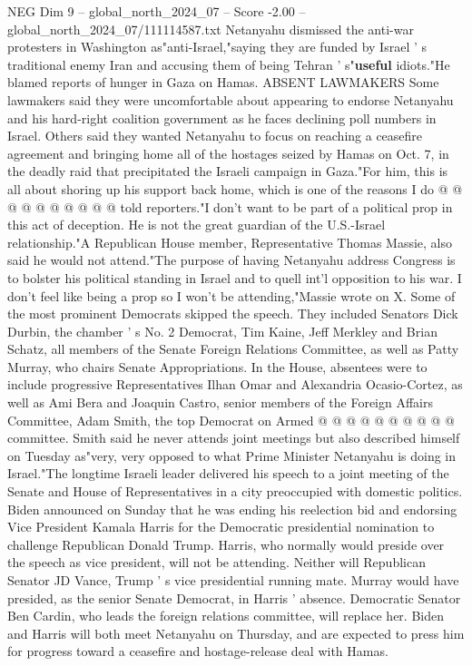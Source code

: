 \begin{textsample}{NEG Dim 9 – global\_north\_2024\_07 – Score -2.00 – global\_north\_2024\_07/111114587.txt}
Netanyahu dismissed the anti-war protesters in Washington as"anti-Israel,"saying they are funded by Israel ' s traditional enemy Iran and accusing them of being Tehran ' s"\textbf{useful} idiots."He blamed reports of hunger in Gaza on Hamas.
ABSENT LAWMAKERS Some lawmakers said they were uncomfortable about appearing to endorse Netanyahu and his hard-right coalition government as he faces declining poll numbers in Israel.
Others said they wanted Netanyahu to focus on reaching a ceasefire agreement and bringing home all of the hostages seized by Hamas on Oct. 7, in the deadly raid that precipitated the Israeli campaign in Gaza."For him, this is all about shoring up his support back home, which is one of the reasons I do @ @ @ @ @ @ @ @ @ @ told reporters."I don't want to be part of a political prop in this act of deception.
He is not the great guardian of the U.S.-Israel relationship."A Republican House member, Representative Thomas Massie, also said he would not attend."The purpose of having Netanyahu address Congress is to bolster his political standing in Israel and to quell int'l opposition to his war.
I don't feel like being a prop so I won't be attending,"Massie wrote on X.
Some of the most prominent Democrats skipped the speech.
They included Senators Dick Durbin, the chamber ' s No. 2 Democrat, Tim Kaine, Jeff Merkley and Brian Schatz, all members of the Senate Foreign Relations Committee, as well as Patty Murray, who chairs Senate Appropriations.
In the House, absentees were to include progressive Representatives Ilhan Omar and Alexandria Ocasio-Cortez, as well as Ami Bera and Joaquin Castro, senior members of the Foreign Affairs Committee, Adam Smith, the top Democrat on Armed @ @ @ @ @ @ @ @ @ @ committee.
Smith said he never attends joint meetings but also described himself on Tuesday as"very, very opposed to what Prime Minister Netanyahu is doing in Israel."The longtime Israeli leader delivered his speech to a joint meeting of the Senate and House of Representatives in a city preoccupied with domestic politics.
Biden announced on Sunday that he was ending his reelection bid and endorsing Vice President Kamala Harris for the Democratic presidential nomination to challenge Republican Donald Trump.
Harris, who normally would preside over the speech as vice president, will not be attending.
Neither will Republican Senator JD Vance, Trump ' s vice presidential running mate.
Murray would have presided, as the senior Senate Democrat, in Harris ' absence.
Democratic Senator Ben Cardin, who leads the foreign relations committee, will replace her.
Biden and Harris will both meet Netanyahu on Thursday, and are expected to press him for progress toward a ceasefire and hostage-release deal with Hamas.

\end{textsample}
